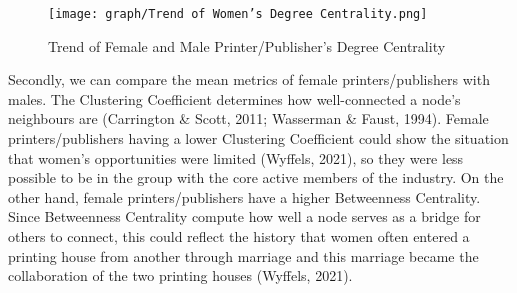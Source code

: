 \documentclass[12pt,a4paper,oneside]{book}
\begin{document}
\begin{sloppypar}
\begin{figure}[H]
\centering
\texttt{[image: graph/Trend of Women’s Degree Centrality.png]}
\caption{Trend of Female and Male Printer/Publisher’s Degree Centrality}
\label{fig:womenDegree}
\end{figure}

Secondly, we can compare the mean metrics of female printers/publishers with males. The Clustering Coefficient determines how well-connected a node’s neighbours are (Carrington \& Scott, 2011; Wasserman \& Faust, 1994). Female printers/publishers having a lower Clustering Coefficient could show the situation that women’s opportunities were limited (Wyffels, 2021), so they were less possible to be in the group with the core active members of the industry. On the other hand, female printers/publishers have a higher Betweenness Centrality. Since Betweenness Centrality compute how well a node serves as a bridge for others to connect, this could reflect the history that women often entered a printing house from another through marriage and this marriage became the collaboration of the two printing houses (Wyffels, 2021).


\end{sloppypar}
\end{document}
